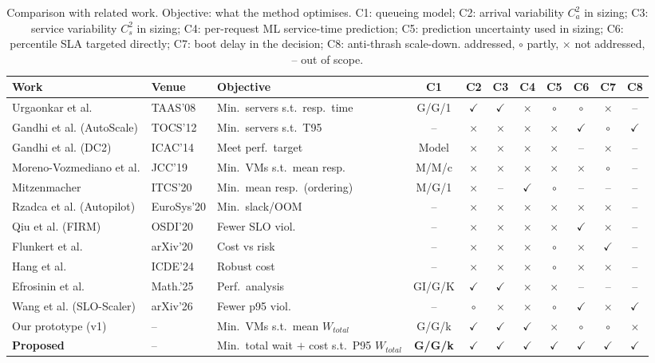 \newcommand{\Y}{$\checkmark$}
\newcommand{\N}{$\times$}
\newcommand{\Pt}{$\circ$}
\begin{table}[t]
\centering
\caption{Comparison with related work. Objective: what the method optimises. C1: queueing model; C2: arrival variability $C_a^2$ in sizing; C3: service variability $C_s^2$ in sizing; C4: per-request ML service-time prediction; C5: prediction uncertainty used in sizing; C6: percentile SLA targeted directly; C7: boot delay in the decision; C8: anti-thrash scale-down. \checkmark{} addressed, $\circ$ partly, $\times$ not addressed, -- out of scope.}
\label{tab:related}
\small
\begin{tabular}{@{}lllcccccccc@{}}
\toprule
Work & Venue & Objective & C1 & C2 & C3 & C4 & C5 & C6 & C7 & C8 \\
\midrule
Urgaonkar et al.            & TAAS'08     & Min.\ servers s.t.\ resp.\ time & G/G/1 & \Y & \Y & \N & \Pt & \Pt & \N  & -- \\
Gandhi et al. (AutoScale)   & TOCS'12     & Min.\ servers s.t.\ T95 & --    & \N & \N & \N & \N  & \Y  & \Pt & \Y \\
Gandhi et al. (DC2)         & ICAC'14     & Meet perf.\ target & Model & \N & \N & \N & \N  & --  & \N  & -- \\
Moreno-Vozmediano et al.    & JCC'19      & Min.\ VMs s.t.\ mean resp. & M/M/c & \N & \N & \N & \N  & \N  & \Pt & -- \\
Mitzenmacher                & ITCS'20     & Min.\ mean resp.\ (ordering) & M/G/1 & \N & -- & \Y & \Pt & --  & --  & -- \\
Rzadca et al. (Autopilot)   & EuroSys'20  & Min.\ slack/OOM & --    & \N & \N & \N & \N  & \N  & \N  & -- \\
Qiu et al. (FIRM)           & OSDI'20     & Fewer SLO viol. & --    & \N & \N & \N & \N  & \Y  & \N  & -- \\
Flunkert et al.             & arXiv'20    & Cost vs risk & --    & \N & \N & \N & \Pt & \N  & \Y  & -- \\
Hang et al.                 & ICDE'24     & Robust cost & --    & \N & \N & \N & \Pt & \N  & \N  & -- \\
Efrosinin et al.            & Math.'25    & Perf.\ analysis & GI/G/K& \Y & \Y & \N & \N  & --  & --  & -- \\
Wang et al. (SLO-Scaler)    & arXiv'26    & Fewer p95 viol. & --    & \Pt& \N & \N & \Pt & \Y  & \N  & \Y \\
Our prototype (v1)          & --          & Min.\ VMs s.t.\ mean $W_{total}$ & G/G/k & \Y & \Y & \Y & \N  & \Pt & \Pt & \N \\
\midrule
\textbf{Proposed}           & --          & Min.\ total wait $+$ cost s.t.\ P95 $W_{total}$ & \textbf{G/G/k} & \Y & \Y & \Y & \Y & \Y & \Y & \Y \\
\bottomrule
\end{tabular}
\end{table}
